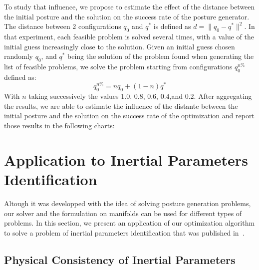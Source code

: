 To study that influence, we propose to estimate the effect of the distance between the initial posture and the solution on the success rate of the posture generator.
The distance between 2 configurations $q_0$ and $q^*$ is defined as $d=\|q_0-q^*\|^2$.
In that experiment, each feasible problem is solved several times, with a value of the initial guess increasingly close to the solution.
Given an initial guess chosen randomly $q_0$, and $q^*$ being the solution of the problem found when generating the list of feasible problems, we solve the problem starting from configurations $q_0^{n\%}$ defined as:
\begin{equation}
  q_0^{n\%} = n q_0 + (1-n)q^*
\end{equation}
With $n$ taking successively the values $1.0$, $0.8$, $0.6$, $0.4$,and $0.2$.
After aggregating the results, we are able to estimate the influence of the distante between the initial posture and the solution on the success rate of the optimization and report those results in the following charts:




\section{Application to Inertial Parameters Identification}
\label{sec:inertial_parameters}

Altough it was developped with the idea of solving posture generation problems, our solver and the formulation on manifolds can be used for different types of problems.
In this section, we present an application of our optimization algorithm to solve a problem of inertial parameters identification that was published in~\cite{traversaro:iros:2016}.

\subsection{Physical Consistency of Inertial Parameters}
\label{sub:physical_consistency_of_inertial_parameters}

